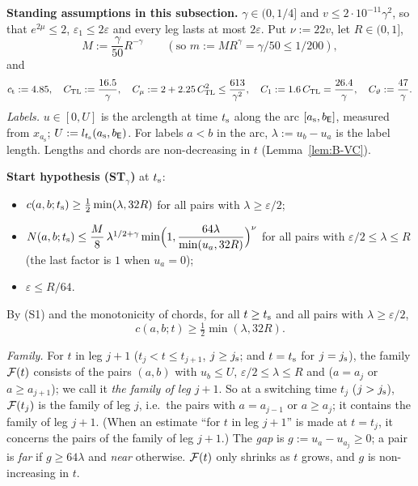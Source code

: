 \medskip\noindent\textbf{Standing assumptions in this subsection.} $\gamma\in(0,1/4]$ and $v\le2\cdot10^{-11}\gamma^2$, so that
$e^{2\mu}\le2$, $\varepsilon_1\le2\varepsilon$ and every leg lasts at most $2\varepsilon$. Put $\nu:=22v$, let $R\in(0,1]$,
\[
M:=\frac\gamma{50}R^{-\gamma}\qquad(\text{so }m:=MR^\gamma=\gamma/50\le1/200),
\]
and
\[
c_{\mathrm t}:=4.85,\quad C_{\mathrm{TL}}:=\frac{16.5}\gamma,\quad C_\mu:=2+2.25\,C_{\mathrm{TL}}^2\le\frac{613}{\gamma^2},\quad
C_1:=1.6\,C_{\mathrm{TL}}=\frac{26.4}\gamma,\quad C_\vartheta:=\frac{47}\gamma .
\]
\emph{Labels.} $u\in[0,U]$ is the arclength at time $t_{\mathrm s}$ along the arc $[a_{\mathrm s},b_{\mathsf E}]$, measured from
$x_{a_{\mathrm s}}$; $U:=l_{t_{\mathrm s}}(a_{\mathrm s},b_{\mathsf E})$. For labels $a<b$ in the arc, $\lambda:=u_b-u_a$ is the label length. Lengths
and chords are non-decreasing in $t$ (Lemma~\ref{lem:B-VC}).

\medskip\noindent\textbf{Start hypothesis (ST$_\gamma$)} at $t_{\mathrm s}$:
\begin{itemize}
\item[(S1)] $c(a,b;t_{\mathrm s})\ge\frac12\min(\lambda,32R)$ for all pairs with $\lambda\ge\varepsilon/2$;
\item[(S2)] $N(a,b;t_{\mathrm s})\le\dfrac M8\,\lambda^{1/2+\gamma}\min\Bigl(1,\dfrac{64\lambda}{\min(u_a,32R)}\Bigr)^{\nu}$ for all pairs
with $\varepsilon/2\le\lambda\le R$ (the last factor is $1$ when $u_a=0$);
\item[(S3)] $\varepsilon\le R/64$.
\end{itemize}
By (S1) and the monotonicity of chords, for all $t\ge t_{\mathrm s}$ and all pairs with $\lambda\ge\varepsilon/2$,
\begin{equation}\label{eq:E-CA}
c(a,b;t)\ge\tfrac12\min(\lambda,32R).
\end{equation}

\emph{Family.} For $t$ in leg $j+1$ ($t_j<t\le t_{j+1}$, $j\ge j_{\mathrm s}$; and $t=t_{\mathrm s}$ for $j=j_{\mathrm s}$), the family $\mathcal F(t)$ consists of the
pairs $(a,b)$ with $u_b\le U$, $\varepsilon/2\le\lambda\le R$ and ($a=a_j$ or $a\ge a_{j+1}$); we call it \emph{the family of leg
$j+1$}. So at a switching time $t_j$ ($j>j_{\mathrm s}$), $\mathcal F(t_j)$ is the family of leg $j$, i.e.\ the pairs with $a=a_{j-1}$ or
$a\ge a_j$; it contains the family of leg $j+1$. (When an estimate ``for $t$ in leg $j+1$'' is made at $t=t_j$, it concerns the
pairs of the family of leg $j+1$.) The \emph{gap} is $g:=u_a-u_{a_j}\ge0$; a pair is \emph{far} if $g\ge64\lambda$ and \emph{near}
otherwise. $\mathcal F(t)$ only shrinks as $t$ grows, and $g$ is non-increasing in $t$.


